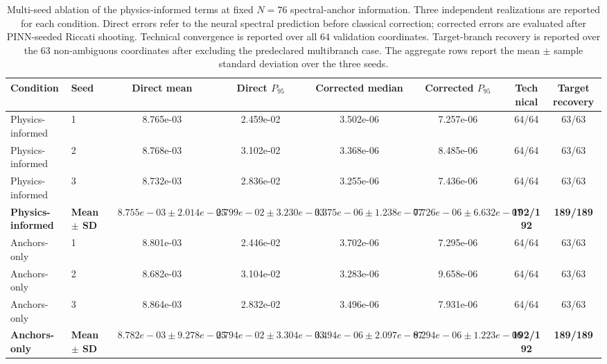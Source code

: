 \begin{table}[t]
\centering
\caption{
Multi-seed ablation of the physics-informed terms at fixed $N=76$
spectral-anchor information. Three independent realizations are reported
for each condition. Direct errors refer to the neural spectral prediction
before classical correction; corrected errors are evaluated after
PINN-seeded Riccati shooting. Technical convergence is reported over all
64 validation coordinates. Target-branch recovery is reported over the
63 non-ambiguous coordinates after excluding the predeclared multibranch
case. The aggregate rows report the mean $\pm$ sample standard deviation
over the three seeds.
}
\label{tab:multiseed_physics_anchors_ablation}
\small
\setlength{\tabcolsep}{4.0pt}
\begin{tabular}{llcccccc}
\toprule
Condition
& Seed
& Direct mean
& Direct $P_{95}$
& Corrected median
& Corrected $P_{95}$
& Technical
& Target recovery \\
\midrule
Physics-informed & 1 & 8.765e-03 & 2.459e-02 & 3.502e-06 & 7.257e-06 & 64/64 & 63/63 \\
Physics-informed & 2 & 8.768e-03 & 3.102e-02 & 3.368e-06 & 8.485e-06 & 64/64 & 63/63 \\
Physics-informed & 3 & 8.732e-03 & 2.836e-02 & 3.255e-06 & 7.436e-06 & 64/64 & 63/63 \\
\textbf{Physics-informed} & \textbf{Mean $\pm$ SD} & $8.755e-03 \pm 2.014e-05$ & $2.799e-02 \pm 3.230e-03$ & $3.375e-06 \pm 1.238e-07$ & $7.726e-06 \pm 6.632e-07$ & \textbf{192/192} & \textbf{189/189} \\
\midrule
Anchors-only & 1 & 8.801e-03 & 2.446e-02 & 3.702e-06 & 7.295e-06 & 64/64 & 63/63 \\
Anchors-only & 2 & 8.682e-03 & 3.104e-02 & 3.283e-06 & 9.658e-06 & 64/64 & 63/63 \\
Anchors-only & 3 & 8.864e-03 & 2.832e-02 & 3.496e-06 & 7.931e-06 & 64/64 & 63/63 \\
\textbf{Anchors-only} & \textbf{Mean $\pm$ SD} & $8.782e-03 \pm 9.278e-05$ & $2.794e-02 \pm 3.304e-03$ & $3.494e-06 \pm 2.097e-07$ & $8.294e-06 \pm 1.223e-06$ & \textbf{192/192} & \textbf{189/189} \\
\bottomrule
\end{tabular}
\end{table}

